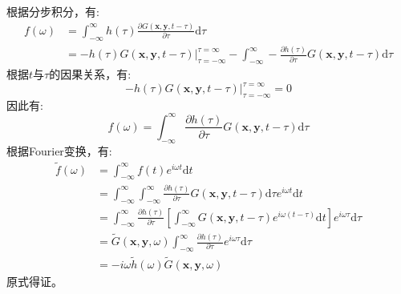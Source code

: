 \begin{enumerate}
\begin{enumerate}
            根据分步积分，有:
            \begin{equation}
                \begin{aligned}
                    f(\omega) &= \int_{-\infty}^{\infty} h(\tau) \frac{\partial G(\mathbf{x},\mathbf{y},t-\tau)}{\partial \tau} \mathrm{d} \tau \\
                    &= \left. - h(\tau) G(\mathbf{x},\mathbf{y},t-\tau) \right|_{\tau = - \infty}^{\tau = \infty} - \int_{-\infty}^{\infty} - \frac{\partial h(\tau)}{\partial \tau} G(\mathbf{x},\mathbf{y},t-\tau) \mathrm{d} \tau
                \end{aligned}
            \end{equation}
            根据$t$与$\tau$的因果关系，有:
            \begin{equation}
                \left. - h(\tau) G(\mathbf{x},\mathbf{y},t-\tau) \right|_{\tau = - \infty}^{\tau = \infty} = 0
            \end{equation}
            因此有:
            \begin{equation}
                \label{eq:mid conclusion 2}
                f(\omega) = \int_{-\infty}^{\infty} \frac{\partial h(\tau)}{\partial \tau} G(\mathbf{x},\mathbf{y},t-\tau) \mathrm{d} \tau
            \end{equation}
            根据Fourier变换，有:
            \begin{equation}
                \label{eq:conclusion 2}
                \begin{aligned}
                    \tilde{f}(\omega) &= \int_{-\infty}^{\infty} f(t) e^{i \omega t} \mathrm{d} t \\
                    &= \int_{-\infty}^{\infty} \int_{-\infty}^{\infty} \frac{\partial h(\tau)}{\partial \tau} G(\mathbf{x},\mathbf{y},t-\tau) \mathrm{d} \tau e^{i \omega t} \mathrm{d} t \\
                    &= \int_{-\infty}^{\infty} \frac{\partial h(\tau)}{\partial \tau} \left[ \int_{-\infty}^{\infty} G(\mathbf{x},\mathbf{y},t-\tau) e^{i \omega (t-\tau)} \mathrm{d} t \right] e^{i \omega \tau} \mathrm{d} \tau \\
                    &= \tilde{G} (\mathbf{x},\mathbf{y},\omega) \int_{-\infty}^{\infty} \frac{\partial h(\tau)}{\partial \tau} e^{i \omega \tau} \mathrm{d} \tau \\
                    &= - i \omega \tilde{h}(\omega) \tilde{G} (\mathbf{x},\mathbf{y},\omega)
                \end{aligned}
            \end{equation}
            原式得证。
    \end{enumerate}


\end{enumerate}
